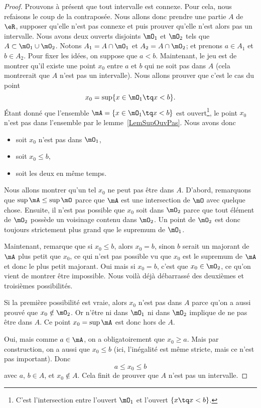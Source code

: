 \begin{proof}
    Prouvons à présent que tout intervalle est connexe. Pour cela, nous refaisons le coup de la contraposée. Nous allons donc prendre une partie $A$ de $\eR$, supposer qu'elle n'est pas connexe et puis prouver qu'elle n'est alors pas un intervalle. Nous avons deux ouverts disjoints $\mO_1$ et $\mO_2$ tels que $A\subset \mO_1\cup \mO_2$. Notons \( A_1 = A \cap \mO_1 \) et  \( A_2 = A \cap \mO_2 \); et prenons $a\in A_1$ et $b\in A_2$. Pour fixer les idées, on suppose que $a<b$. Maintenant, le jeu est de montrer qu'il existe une point $x_0$ entre $a$ et $b$ qui ne soit pas dans $A$ (cela montrerait que $A$ n'est pas un intervalle). Nous allons prouver que c'est le cas du point
    \[
      x_0=\sup\{ x\in\mO_1\tq x<b \}.
    \]
    Étant donné que l'ensemble $\mA=\{ x\in\mO_1\tq x<b \}$ est ouvert\footnote{C'est l'intersection entre l'ouvert $\mO_1$ et l'ouvert $\{x\tq x<b \}$.}, le point $x_0$ n'est pas dans l'ensemble par le lemme~\ref{LemSupOuvPas}. Nous avons donc
    \begin{itemize}
        \item soit $x_0$ n'est pas dans $\mO_1$,
        \item soit $x_0\leq b$,
        \item soit les deux en même temps.
    \end{itemize}
    Nous allons montrer qu'un tel $x_0$ ne peut pas être dans $A$. D'abord, remarquons que $\sup\mA\leq\sup\mO$ parce que $\mA$ est une intersection de $\mO$ avec quelque chose. Ensuite, il n'est pas possible que $x_0$ soit dans $\mO_2$ parce que tout élément de $\mO_2$ possède un voisinage contenu dans $\mO_2$. Un point de $\mO_2$ est donc toujours strictement plus grand que le supremum de $\mO_1$.

    Maintenant, remarque que si $x_0\leq b$, alors $x_0=b$, sinon $b$ serait un majorant de $\mA$ plus petit que $x_0$, ce qui n'est pas possible vu que $x_0$ est le supremum de $\mA$ et donc le plus petit majorant. Oui mais si $x_0=b$, c'est que $x_0\in\mO_2$, ce qu'on vient de montrer être impossible. Nous voilà déjà débarrassé des deuxièmes et troisièmes possibilités.

    Si la première possibilité est vraie, alors $x_0$ n'est pas dans $A$ parce qu'on a aussi prouvé que $x_0\notin\mO_2$. Or n'être ni dans $\mO_1$ ni dans $\mO_2$ implique de ne pas être dans $A$. Ce point $x_0=\sup\mA$ est donc hors de $A$.

    Oui, mais comme $a\in\mA$, on a obligatoirement que $x_0\geq a$. Mais par construction, on a aussi que $x_0\leq b$ (ici, l'inégalité est même stricte, mais ce n'est pas important). Donc
    \[
      a\leq x_0\leq b
    \]
    avec $a$, $b\in A$, et $x_0\notin A$. Cela finit de prouver que $A$ n'est pas un intervalle.
\end{proof}

